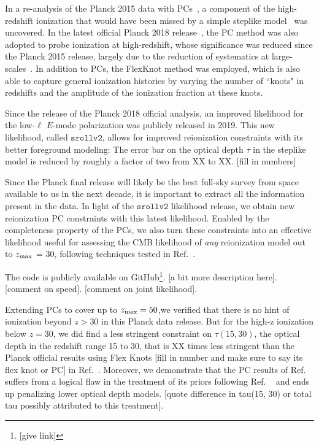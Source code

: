 \documentclass[prd,twocolumn,amsmath,amssymb,floatfix,superscriptaddress,nofootinbib]{revtex4-1}
\newcommand{\zmax}{z_{\rm max}}
\begin{document}
In a re-analysis of the Planck 2015 data with PCs~\cite{Heinrich:2016ojb}, a component of the high-redshift ionization that would have been missed by a simple steplike model~\cite{Heinrich:2016ojb} was uncovered. In the latest official Planck 2018 release~\cite{Aghanim:2018eyx}, the PC method was also adopted to probe ionization at high-redshift, whose significance was reduced since the Planck 2015 release, largely due to the reduction of systematics at large-scales~\cite{Aghanim:2018eyx, Heinrich:2018btc}. In addition to PCs, the FlexKnot method was employed, which is also able to capture general ionization histories by varying the number of ``knots" in redshifts and the amplitude of the ionization fraction at these knots. 

Since the release of the Planck 2018 official analysis, an improved likelihood for the low-$\ell$ $E$-mode polarization was publicly released in 2019. This new likelihood, called $\texttt{srollv2}$, allows for improved reionization constraints with its better foreground modeling: The error bar on the optical depth $\tau$ in the steplike model is reduced by roughly a factor of two from XX to XX. [fill in numbers]

Since the Planck final release will likely be the best full-sky survey from space available to us in the next decade, it is important to extract all the information present in the data. In light of the $\texttt{srollv2}$ likelihood release, we obtain new reionization PC constraints with this latest likelihood. Enabled by the completeness property of the PCs, we also turn these constraints into an effective likelihood useful for assessing the CMB likelihood of \textit{any} reionization model out to $\zmax$ = 30, following techniques tested in Ref.~\cite{Heinrich:2016ojb}. 

The code is publicly available on GitHub\footnote{[give link]}. [a bit more description here]. [comment on speed]. [comment on joint likelihood].

Extending PCs to cover up to $z_{\rm max} = 50$,we verified that there is no hint of ionization beyond $z>30$ in this Planck data release. But for the high-z ionization below $z=30$, we did find a less stringent constraint on $\tau(15, 30)$, the optical depth in the redshift range 15 to 30, that is XX times less stringent than the Planck official results using Flex Knots [fill in number and make sure to say its flex knot or PC] in Ref.~\cite{Aghanim:2018eyx}. Moreover, we demonstrate that the PC results of Ref.~\cite{Aghanim:2018eyx} suffers from a logical flaw in the treatment of its priors following Ref.
~\cite{Millea:2018bko} and ends up penalizing lower optical depth models. [quote difference in tau(15, 30) or total tau possibly attributed to this treatment]. %
\end{document}
